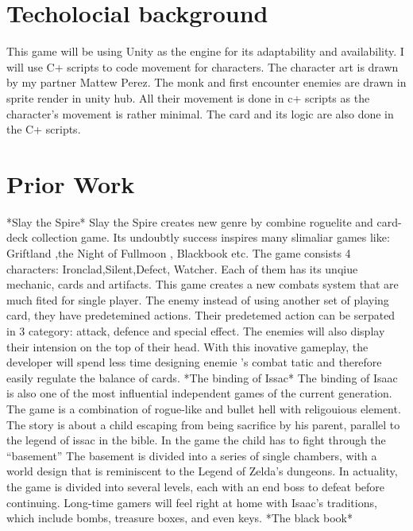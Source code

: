 \documentclass[10pt,twocolumn]{article}
\begin{document}
\section{Techolocial background}

This game will be using Unity as the engine for its adaptability and availability. I will use C+ scripts to code movement for characters. The character art is drawn by my partner Mattew Perez. The monk and first encounter enemies are drawn in sprite render in unity hub. All their movement is done in c+ scripts as the character’s movement is rather minimal. The card and its logic are also done in the C+ scripts.


\section{Prior Work  }
*Slay the Spire*
Slay the Spire creates new genre by combine roguelite and card-deck collection game. Its undoubtly success inspires many slimaliar games like: Griftland ,the Night of Fullmoon , Blackbook etc. The game consists 4 characters: Ironclad,Silent,Defect, Watcher. Each of them has its unqiue mechanic, cards and artifacts. This game creates a new combats system that are much fited for single player. The enemy instead of using another set of playing card, they have predetemined actions. Their predetemed action can be serpated in 3 category: attack, defence and special effect. The enemies will also display their intension on the top of their head. With this inovative gameplay, the developer will spend less time designing enemie 's combat tatic and therefore easily regulate the balance of cards.
*The binding of Issac*
	The binding of Isaac is also one of the most influential independent games of the current generation. The game is a combination of rogue-like and bullet hell with religouious element. The story is about a child escaping from being sacrifice by his parent, parallel to the legend of issac in the bible. In the game the child has to fight through the “basement”  The basement is divided into a series of single chambers, with a world design that is reminiscent to the Legend of Zelda's dungeons. In actuality, the game is divided into several levels, each with an end boss to defeat before continuing. Long-time gamers will feel right at home with Isaac's traditions, which include bombs, treasure boxes, and even keys.
*The black book*
\end{document}
